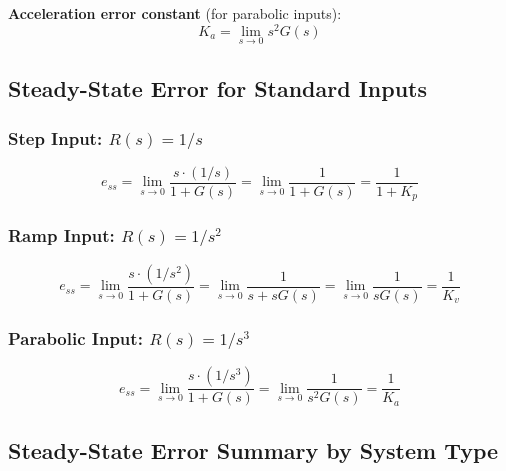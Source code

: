 \textbf{Acceleration error constant} (for parabolic inputs):
\begin{equation}
    \boxed{K_a = \lim_{s\to 0} s^2G(s)}
    \label{eq:Ka}
\end{equation}

\subsection{Steady-State Error for Standard Inputs}

\subsubsection{Step Input: $R(s) = 1/s$}

\begin{equation}
    e_{ss} = \lim_{s\to 0} \frac{s \cdot (1/s)}{1 + G(s)} = \lim_{s\to 0} \frac{1}{1 + G(s)} = \frac{1}{1 + K_p}
    \label{eq:ess_step}
\end{equation}

\subsubsection{Ramp Input: $R(s) = 1/s^2$}

\begin{equation}
    e_{ss} = \lim_{s\to 0} \frac{s \cdot (1/s^2)}{1 + G(s)} = \lim_{s\to 0} \frac{1}{s + sG(s)} = \lim_{s\to 0} \frac{1}{sG(s)} = \frac{1}{K_v}
    \label{eq:ess_ramp}
\end{equation}

\subsubsection{Parabolic Input: $R(s) = 1/s^3$}

\begin{equation}
    e_{ss} = \lim_{s\to 0} \frac{s \cdot (1/s^3)}{1 + G(s)} = \lim_{s\to 0} \frac{1}{s^2G(s)} = \frac{1}{K_a}
    \label{eq:ess_parabola}
\end{equation}

\subsection{Steady-State Error Summary by System Type}


